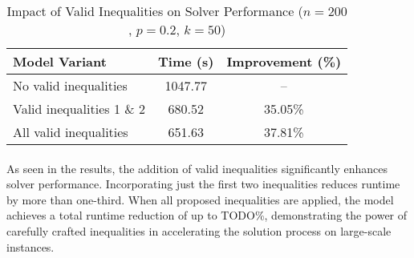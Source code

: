 \begin{table}[H]
\centering
\caption{Impact of Valid Inequalities on Solver Performance ($n=200$, $p=0.2$, $k=50$)}
\label{tab:performance2}
\begin{tabular}{l|c|c}
\textbf{Model Variant} & \textbf{Time (s)} & \textbf{Improvement (\%)} \\
\hline
No valid inequalities        & 1047.77 & -- \\
Valid inequalities 1 \& 2    & 680.52 & 35.05\% \\
All valid inequalities       & 651.63 & 37.81\% \\
\end{tabular}
\end{table}

\paragraph{} As seen in the results, the addition of valid inequalities significantly enhances solver performance. Incorporating just the first two inequalities reduces runtime by more than one-third. When all proposed inequalities are applied, the model achieves a total runtime reduction of up to TODO\%, demonstrating the power of carefully crafted inequalities in accelerating the solution process on large-scale instances.
